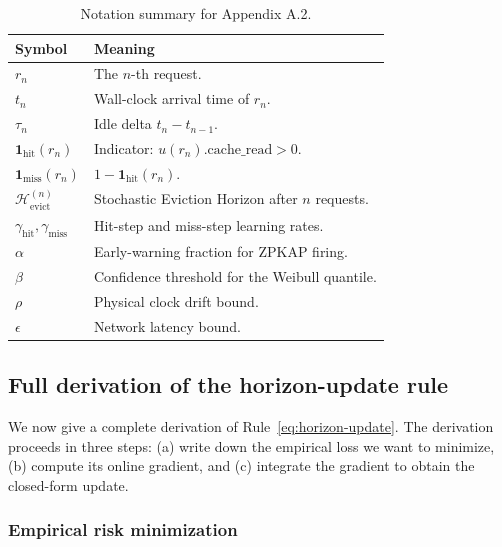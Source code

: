 \begin{table}[ht]
\centering
\caption{Notation summary for Appendix A.2.}
\label{tab:apg-notation}
\begin{tabular}{ll}
\toprule
\textbf{Symbol} & \textbf{Meaning} \\
\midrule
$r_n$ & The $n$-th request. \\
$t_n$ & Wall-clock arrival time of $r_n$. \\
$\tau_n$ & Idle delta $t_n - t_{n-1}$. \\
$\mathbf{1}_{\text{hit}}(r_n)$ & Indicator: $u(r_n).\mathrm{cache\_read} > 0$. \\
$\mathbf{1}_{\text{miss}}(r_n)$ & $1 - \mathbf{1}_{\text{hit}}(r_n)$. \\
$\mathcal{H}_{\text{evict}}^{(n)}$ & Stochastic Eviction Horizon after $n$ requests. \\
$\gamma_{\text{hit}}, \gamma_{\text{miss}}$ & Hit-step and miss-step learning rates. \\
$\alpha$ & Early-warning fraction for ZPKAP firing. \\
$\beta$ & Confidence threshold for the Weibull quantile. \\
$\rho$ & Physical clock drift bound. \\
$\epsilon$ & Network latency bound. \\
\bottomrule
\end{tabular}
\end{table}


\subsection{Full derivation of the horizon-update rule}
\label{app:apg:deriv}

We now give a complete derivation of
Rule~\eqref{eq:horizon-update}. The derivation proceeds in three
steps: (a) write down the empirical loss we want to minimize,
(b) compute its online gradient, and (c) integrate the gradient
to obtain the closed-form update.

\subsubsection{Empirical risk minimization}

